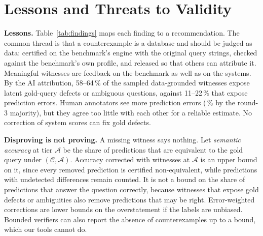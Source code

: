\section{Lessons and Threats to Validity}\label{sec:threats}


\textbf{Lessons.} Table~\ref{tab:findings} maps each finding to a recommendation. The common thread is that a counterexample is a database and should be judged as data: certified on the benchmark's engine with the original query strings, checked against the benchmark's own profile, and released so that others can attribute it. Meaningful witnesses are feedback on the benchmark as well as on the systems. By the AI attribution, 58--64\,\% of the sampled data-grounded witnesses expose latent gold-query defects or ambiguous questions, against 11--22\,\% that expose prediction errors. Human annotators see more prediction errors (\,\% by the round-3 majority), but they agree too little with each other for a reliable estimate. No correction of system scores can fix gold defects.

\textbf{Disproving is not proving.} A missing witness says nothing. Let \emph{semantic accuracy} at tier $\mathcal A$ be the share of predictions that are equivalent to the gold query under $(\mathcal C,\mathcal A)$. Accuracy corrected with witnesses at $\mathcal A$ is an upper bound on it, since every removed prediction is certified non-equivalent, while predictions with undetected differences remain counted. It is not a bound on the share of predictions that answer the question correctly, because witnesses that expose gold defects or ambiguities also remove predictions that may be right. Error-weighted corrections are lower bounds on the overstatement if the labels are unbiased. Bounded verifiers can also report the absence of counterexamples up to a bound, which our tools cannot do.

